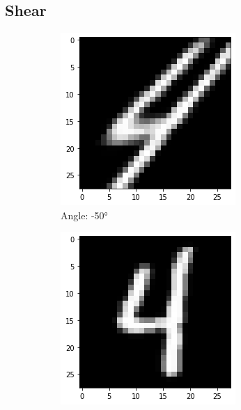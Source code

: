 \subsection{Shear}  
    \begin{figure}[!htbp]
        \centering
        \begin{subfigure}[b]{.3\textwidth}
            \includegraphics[width=\linewidth]{images/shear1.png}
            \caption{Angle: \ang{-50}}
            \label{fig:Rotate-misclass0}
        \end{subfigure}%
        \begin{subfigure}[b]{.3\textwidth}
            \includegraphics[width=\textwidth]{images/shear2.png}

\end{subfigure}
\end{figure}
